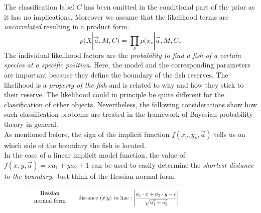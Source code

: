 \documentclass[12pt, a4paper]{scrartcl}
\begin{document}
The classification label $C$ has been omitted in the conditional part of the prior as it has no implications. 
Moreover we assume that the likelihood terms are \textit{uncorrelated} resulting in a product form. \[p(X|\vec{a},M,C)=\prod_{\nu}p(x_{\nu}|\vec{a},M,C_{\nu}\]
The individual likelihood factors are the \textit{probability to find a fish of a certain species at a specific position}.
Here, the model and the corresponding parameters are important because they define the boundary of the fish reserves.
The likelihood is a \textit{property of the fish} and is related to why and how they stick to their reserve. 
The likelihood could in principle be quite different for the classification of other objects.
Nevertheless, the following considerations show how such classification problems are treated in
the framework of Bayesian probability theory in general.\\
As mentioned before, the sign of the implicit function $f(x_{\nu},y_{\nu},\vec{a})$ tells us on which side of the boundary the fish is located. \\

In the case of a linear implicit model function, the value of $f(x,y,\vec{a})=xa_1+ya_2+1$ can be used to easily determine the \textit{shortest distance to the boundary}. Just think of the Hessian normal form.%
\begin{figure}[H]
	\centering
	\includegraphics[width=0.75\textwidth]{7_13.png}
\end{figure}
\end{document}
